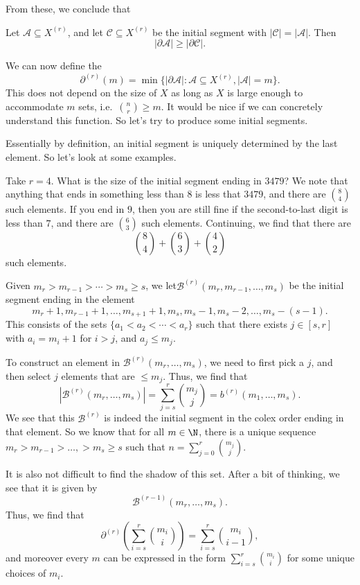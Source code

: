 \documentclass[a4paper]{article}
\begin{document}
From these, we conclude that
\begin{thm}
  Let $\mathcal{A} \subseteq X^{(r)}$, and let $\mathcal{C} \subseteq X^{(r)}$ be the initial segment with $|\mathcal{C}| = |\mathcal{A}|$. Then
  \[
    |\partial \mathcal{A}| \geq |\partial \mathcal{C}|.
  \]
\end{thm}

We can now define the 
\[
  \partial^{(r)}(m) = \min\{|\partial \mathcal{A}| : \mathcal{A} \subseteq X^{(r)}, |\mathcal{A}| = m\}.
\]
This does not depend on the size of $X$ as long as $X$ is large enough to accommodate $m$ sets, i.e.\ $\binom{n}{r} \geq m$. It would be nice if we can concretely understand this function. So let's try to produce some initial segments.

Essentially by definition, an initial segment is uniquely determined by the last element. So let's look at some examples.
\begin{eg}
  Take $r = 4$. What is the size of the initial segment ending in $3479$? We note that anything that ends in something less than $8$ is less that $3479$, and there are $\binom{8}{4}$ such elements. If you end in $9$, then you are still fine if the second-to-last digit is less than $7$, and there are $\binom{6}{3}$ such elements. Continuing, we find that there are
  \[
    \binom{8}{4} + \binom{6}{3} + \binom{4}{2}
  \]
  such elements.
\end{eg}

Given $m_r > m_{r - 1} > \cdots > m_s \geq s$, we let$\mathcal{B}^{(r)}(m_r, m_{r - 1}, \ldots, m_s)$ be the initial segment ending in the element
\[
  m_r + 1, m_{r - 1} + 1, \ldots, m_{s + 1} + 1, m_s, m_s - 1, m_s - 2, \ldots, m_s - (s - 1).
\]
This consists of the sets $\{a_1 < a_2 < \cdots < a_r\}$ such that there exists $j \in [s, r]$ with $a_i = m_i + 1$ for $i > j$, and $a_j \leq m_j$.

To construct an element in $\mathcal{B}^{(r)}(m_r, \ldots, m_s)$, we need to first pick a $j$, and then select $j$ elements that are $\leq m_j$. Thus, we find that
\[
  |\mathcal{B}^{(r)}(m_r, \ldots, m_s)| = \sum_{j = s}^r \binom{m_j}{j} = b^{(r)} (m_1, \ldots, m_s).
\]
We see that this $\mathcal{B}^{(r)}$ is indeed the initial segment in the colex order ending in that element. So we know that for all $m \in \N$, there is a unique sequence $m_r > m_{r - 1} > \ldots, > m_s \geq s$ such that $n = \sum_{j = 0}^r \binom{m_j}{j}$.

It is also not difficult to find the shadow of this set. After a bit of thinking, we see that it is given by
\[
  \mathcal{B}^{(r - 1)} (m_r, \ldots, m_s).
\]
Thus, we find that
\[
  \partial^{(r)}\left( \sum_{i = s}^r \binom{m_i}{i}\right) = \sum_{i = s}^r \binom{m_i}{i - 1},
\]
and moreover every $m$ can be expressed in the form $\sum_{i = s}^r \binom{m_i}{i}$ for some unique choices of $m_i$.
\end{document}
